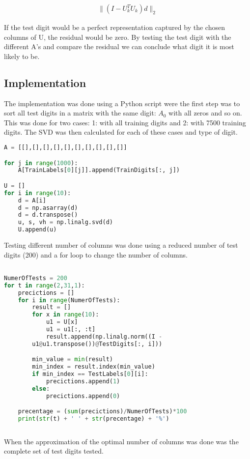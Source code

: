 \documentclass[a4paper]{article}
\begin{document}
\begin{equation}
	\begin{aligned}
		\|(I-U^{T}_kU_k)d\|_2
	\end{aligned}
\end{equation}

If the test digit would be a perfect representation captured by the chosen columns of U, the residual would be zero. By testing the test digit with the different A's and compare the residual we can conclude what digit it is most likely to be.  

\subsection*{Implementation}
The implementation was done using a Python script were the first step was to sort all test digits in a matrix with the same digit: $A_0$ with all zeros and so on. This was done for two cases: 1: with all training digits and 2: with 7500 training digits. The SVD was then calculated for each of these cases and type of digit.  

\begin{lstlisting}[language=Python]
A = [[],[],[],[],[],[],[],[],[],[]]

for j in range(1000):
    A[TrainLabels[0][j]].append(TrainDigits[:, j])

U = []
for i in range(10):
    d = A[i]
    d = np.asarray(d)
    d = d.transpose()
    u, s, vh = np.linalg.svd(d)
    U.append(u)

\end{lstlisting}

Testing different number of columns was done using a reduced number of test digits (200) and a for loop to change the number of columns. 

\begin{lstlisting}[language=Python]

NumerOfTests = 200
for t in range(2,31,1):
    precictions = []
    for i in range(NumerOfTests):
        result = []
        for x in range(10):
            u1 = U[x]
            u1 = u1[:, :t]
            result.append(np.linalg.norm((I - 
	    u1@u1.transpose())@TestDigits[:, i]))

        min_value = min(result)
        min_index = result.index(min_value)
        if min_index == TestLabels[0][i]:
            precictions.append(1)
        else:
            precictions.append(0)

    precentage = (sum(precictions)/NumerOfTests)*100
    print(str(t) + ' ' + str(precentage) + '%')
	
\end{lstlisting}
When the approximation of the optimal number of columns was done was the complete set of test digits tested.
\end{document}
